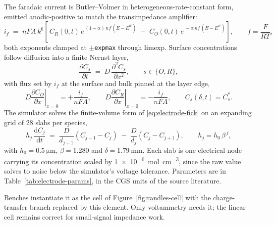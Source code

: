 The faradaic current is Butler--Volmer in heterogeneous-rate-constant form,
emitted anodic-positive to match the transimpedance amplifier:
\begin{equation}\label{eq:electrode-bv}
  i_f \;=\; nFA\,k^{0}\!\left[\,C_R(0,t)\,
      e^{\,(1-\alpha)\,n f\,(E-E^{0\prime})}
    \;-\; C_O(0,t)\,
      e^{\,-\alpha\,n f\,(E-E^{0\prime})}\right],
  \qquad f = \frac{F}{RT},
\end{equation}
both exponents clamped at \(\pm\)\texttt{expmax} through \(\mathrm{limexp}\).
Surface concentrations follow diffusion into a finite Nernst layer,
\begin{equation}\label{eq:electrode-fick}
  \frac{\partial C_s}{\partial t} \;=\; D\,
  \frac{\partial^{2} C_s}{\partial x^{2}},
  \qquad s \in \{O, R\},
\end{equation}
with flux set by \(i_f\) at the surface and bulk pinned at the layer edge,
\begin{equation}\label{eq:electrode-bc}
  D\!\left.\frac{\partial C_O}{\partial x}\right|_{x=0} = +\frac{i_f}{nFA},
  \qquad
  D\!\left.\frac{\partial C_R}{\partial x}\right|_{x=0} = -\frac{i_f}{nFA},
  \qquad
  C_s(\delta, t) = C_s^{*}.
\end{equation}
The simulator solves the finite-volume form of \eqref{eq:electrode-fick} on an
expanding grid of 28 slabs per species,
\begin{equation}\label{eq:electrode-box}
  h_j\,\frac{\mathrm{d} C_j}{\mathrm{d} t}
  \;=\; \frac{D}{d_{j-1}}\left(C_{j-1}-C_j\right)
   \;-\; \frac{D}{d_j}\left(C_j-C_{j+1}\right),
  \qquad h_j = h_0\,\beta^{\,j},
\end{equation}
with \(h_0 = \SI{0.5}{\micro\metre}\), \(\beta = 1.280\) and
\(\delta = \SI{1.79}{\milli\metre}\). Each slab is one electrical node carrying
its concentration scaled by \SI{1e-6}{\mole\per\cubic\centi\metre}, since the
raw value solves to noise below the simulator's voltage tolerance. Parameters
are in Table~\ref{tab:electrode-params}, in the CGS units of the source
literature.

Benches instantiate it as the cell of Figure~\ref{fig:randles-cell} with the
charge-transfer branch replaced by this element. Only voltammetry needs it; the
linear cell remains correct for small-signal impedance work.
